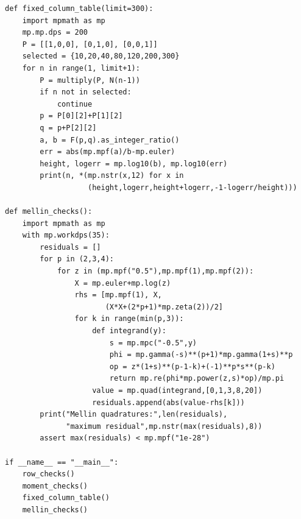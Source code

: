 \documentclass[11pt,a4paper]{article}
\theoremstyle{definition}
\theoremstyle{remark}
\numberwithin{equation}{section}
\begin{document}
\begin{lstlisting}
def fixed_column_table(limit=300):
    import mpmath as mp
    mp.mp.dps = 200
    P = [[1,0,0], [0,1,0], [0,0,1]]
    selected = {10,20,40,80,120,200,300}
    for n in range(1, limit+1):
        P = multiply(P, N(n-1))
        if n not in selected:
            continue
        p = P[0][2]+P[1][2]
        q = p+P[2][2]
        a, b = F(p,q).as_integer_ratio()
        err = abs(mp.mpf(a)/b-mp.euler)
        height, logerr = mp.log10(b), mp.log10(err)
        print(n, *(mp.nstr(x,12) for x in
                   (height,logerr,height+logerr,-1-logerr/height)))

def mellin_checks():
    import mpmath as mp
    with mp.workdps(35):
        residuals = []
        for p in (2,3,4):
            for z in (mp.mpf("0.5"),mp.mpf(1),mp.mpf(2)):
                X = mp.euler+mp.log(z)
                rhs = [mp.mpf(1), X,
                       (X*X+(2*p+1)*mp.zeta(2))/2]
                for k in range(min(p,3)):
                    def integrand(y):
                        s = mp.mpc("-0.5",y)
                        phi = mp.gamma(-s)**(p+1)*mp.gamma(1+s)**p
                        op = z*(1+s)**(p-1-k)+(-1)**p*s**(p-k)
                        return mp.re(phi*mp.power(z,s)*op)/mp.pi
                    value = mp.quad(integrand,[0,1,3,8,20])
                    residuals.append(abs(value-rhs[k]))
        print("Mellin quadratures:",len(residuals),
              "maximum residual",mp.nstr(max(residuals),8))
        assert max(residuals) < mp.mpf("1e-28")

if __name__ == "__main__":
    row_checks()
    moment_checks()
    fixed_column_table()
    mellin_checks()


\end{lstlisting}
\end{document}
